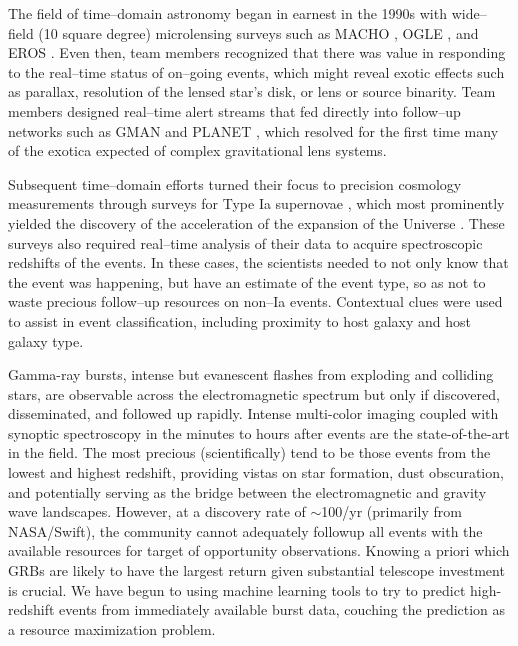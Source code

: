  \smallskip

The field of time--domain astronomy began in earnest in the 1990s with
wide--field (10 square degree) microlensing surveys such as MACHO
\citep{2000ApJ...542..281A}, OGLE \citep{1994AcA....44..227U}, and EROS
\citep{2003A&A...400..951A}.   Even then, team members recognized that there was
value in responding to the real--time status of on--going events, which might
reveal exotic effects such as parallax, resolution of the lensed star's disk, or
lens or source binarity.  Team members designed real--time alert streams that
fed directly into follow--up networks such as GMAN \citep{2000PhDT.......258B}
and PLANET \citep{1998ApJ...509..687A}, which resolved for the first time many
of the exotica expected of complex gravitational lens systems.

Subsequent time--domain efforts turned their focus to precision cosmology
measurements through surveys for Type Ia supernovae \citep{1996AJ....112.2398H},
which most prominently yielded the discovery of the acceleration of the
expansion of the Universe \citep{1998AJ....116.1009R,1999ApJ...517..565P}. These
surveys also required real--time analysis of their data to acquire spectroscopic
redshifts of the events. In these cases, the scientists needed to not only know
that the event was happening, but have an estimate of the event type, so as not
to waste precious follow--up resources on non--Ia events.  Contextual clues were
used to assist in event classification, including proximity to host galaxy and
host galaxy type.

Gamma-ray bursts, intense but evanescent flashes from exploding and colliding stars, are observable across the electromagnetic spectrum but only if discovered, disseminated, and followed up rapidly. Intense multi-color imaging coupled with synoptic spectroscopy in the minutes to hours after events are the state-of-the-art in the field. The most precious (scientifically) tend to be those events from the lowest and highest redshift, providing vistas on star formation, dust obscuration, and potentially serving as the bridge between the electromagnetic and gravity wave landscapes. However, at a discovery rate of $\sim$100/yr (primarily from NASA/Swift), the community cannot adequately followup all events with the available resources for target of opportunity observations. Knowing a priori which GRBs are likely to have the largest return given substantial telescope investment is crucial. We \citep{morgan} have begun to using machine learning tools to try to predict high-redshift events from immediately available burst data, couching the prediction as a resource maximization problem.

